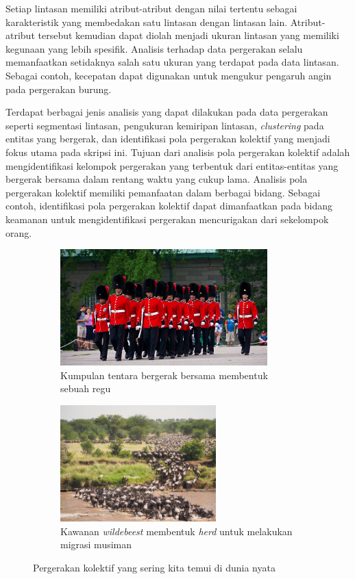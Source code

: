 \documentclass[a4paper,twoside]{article}
\begin{document}
Setiap lintasan memiliki atribut-atribut dengan nilai tertentu sebagai karakteristik yang membedakan satu lintasan dengan lintasan lain. Atribut-atribut tersebut kemudian dapat diolah menjadi ukuran lintasan yang memiliki kegunaan yang lebih spesifik. Analisis terhadap data pergerakan selalu memanfaatkan setidaknya salah satu ukuran yang terdapat pada data lintasan. Sebagai contoh, kecepatan dapat digunakan untuk mengukur pengaruh angin pada pergerakan burung.

Terdapat berbagai jenis analisis yang dapat dilakukan pada data pergerakan seperti segmentasi lintasan, pengukuran kemiripan lintasan, \textit{clustering} pada entitas yang bergerak, dan identifikasi pola pergerakan kolektif yang menjadi fokus utama pada skripsi ini. Tujuan dari analisis pola pergerakan kolektif adalah mengidentifikasi kelompok pergerakan yang terbentuk dari entitas-entitas yang bergerak bersama dalam rentang waktu yang cukup lama. Analisis pola pergerakan kolektif memiliki pemanfaatan dalam berbagai bidang. Sebagai contoh, identifikasi pola pergerakan kolektif dapat dimanfaatkan pada bidang keamanan untuk mengidentifikasi pergerakan mencurigakan dari sekelompok orang.

\iffalse

\begin{figure}[h]
    \centering
    \begin{subfigure}[h]{0.45\textwidth}
        \centering
        \includegraphics[width=\textwidth, height=4.5cm]{Gambar/army.jpg}
        \caption{Kumpulan tentara bergerak bersama membentuk sebuah regu\protect\footnotemark}
    \end{subfigure}
    \begin{subfigure}[h]{0.45\textwidth}
        \centering
        \includegraphics[width=\textwidth, height=4.5cm]{Gambar/wildebeest.jpg}
        \caption{Kawanan \textit{wildebeest} membentuk \textit{herd} untuk melakukan migrasi musiman\protect\footnotemark}
    \end{subfigure}
    \caption[Pergerakan kolektif dunia nyata]{Pergerakan kolektif yang sering kita temui di dunia nyata}
    \label{bab1:collective-movement}
\end{figure}
\end{document}
